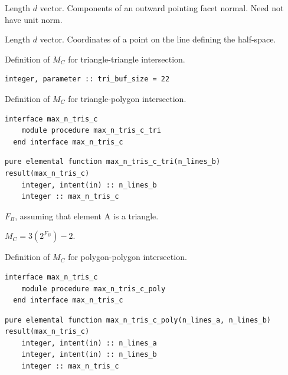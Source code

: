 \documentclass{article}
\begin{document}
\begin{description}[font=\ttfamily\bfseries,leftmargin=2.2\parindent,labelindent=1.7\parindent,noitemsep]
  \item[normal] Length $d$ vector. Components of an outward pointing facet
    normal. Need not have unit norm.
  \item[point] Length $d$ vector. Coordinates of a point on the line defining
    the half-space.
\end{description}

\noindent Definition of $M_C$ for triangle-triangle intersection.
  
\begin{lstlisting}[language=FORTRAN] 
  integer, parameter :: tri_buf_size = 22
\end{lstlisting}

\noindent Definition of $M_C$ for triangle-polygon intersection.
  
\begin{lstlisting}[language=FORTRAN]
  interface max_n_tris_c
    module procedure max_n_tris_c_tri
  end interface max_n_tris_c
\end{lstlisting}

\begin{lstlisting}[language=FORTRAN]
  pure elemental function max_n_tris_c_tri(n_lines_b) result(max_n_tris_c)
    integer, intent(in) :: n_lines_b
    integer :: max_n_tris_c
\end{lstlisting} 

\begin{description}[font=\ttfamily\bfseries,leftmargin=2.2\parindent,labelindent=1.7\parindent,noitemsep]
  \item[n\_lines\_b] $F_B$, assuming that element A is a triangle.
  \item[max\_n\_tris\_c] $M_C = 3 \left( 2^{F_B} \right) - 2$.
\end{description}

\noindent Definition of $M_C$ for polygon-polygon intersection.

\begin{lstlisting}[language=FORTRAN]
  interface max_n_tris_c
    module procedure max_n_tris_c_poly
  end interface max_n_tris_c
\end{lstlisting} 

\begin{lstlisting}[language=FORTRAN]
  pure elemental function max_n_tris_c_poly(n_lines_a, n_lines_b) result(max_n_tris_c)
    integer, intent(in) :: n_lines_a
    integer, intent(in) :: n_lines_b
    integer :: max_n_tris_c
\end{lstlisting} 
\end{document}
